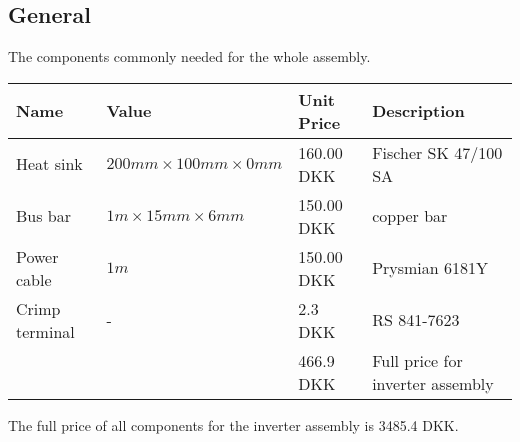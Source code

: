 \subsection{General}
The components commonly needed for the whole assembly.
\begin{table}[H]
\centering
\footnotesize
\begin{tabular}{|p{2cm} p{3cm} p{2cm} p{6cm}|} \hline
\textbf{Name}    & \textbf{Value} & \textbf{Unit Price}
& \textbf{Description}                            \\ \hline
Heat sink            & $200mm \times 100mm \times 0mm $ & 160.00 DKK     & Fischer SK 47/100 SA  \\
Bus bar                  & $1m \times 15mm \times 6mm $ & 150.00 DKK     & copper bar            \\ 
Power cable              & $1m                        $ & 150.00 DKK     & Prysmian 6181Y        \\
Crimp terminal           & -                            & 2.3 DKK        & RS 841-7623           \\ \hline
&& 466.9 DKK & Full price for inverter assembly \\ \hline
\end{tabular}
\end{table}

The full price of all components for the inverter assembly is 3485.4 DKK.
